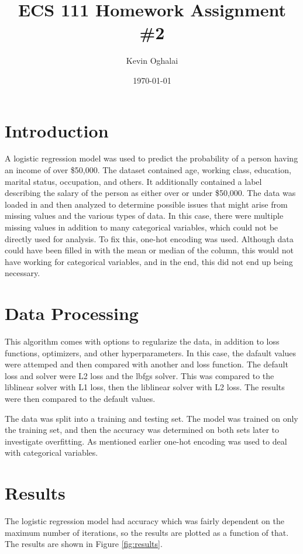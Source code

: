\documentclass[12pt]{article}
\title{ECS 111 Homework Assignment \#2}
\author{Kevin Oghalai}
\date{\today}
\begin{document}
\maketitle
\section{Introduction}
A logistic regression model was used to predict the probability of 
a person having an income of over \$50,000. The dataset contained age, working class, 
education, marital status, occupation, and others. It additionally contained a 
label describing the salary of the person as either over or under \$50,000.
The data was loaded in and then analyzed 
to determine possible issues that might arise from
missing values and the various types of data. 
In this case, there were multiple missing values 
in addition to many categorical variables, which could not be 
directly used for analysis. To fix this, one-hot encoding was used. 
Although data could have been filled in with the mean or median of the 
column, this would not have working for categorical variables, and in the end,
this did not end up being necessary.

\section{Data Processing}
This algorithm comes with
options to regularize the data, in addition to loss functions, optimizers, and other 
hyperparameters. In this case, the dafault values were attemped and then compared with another
and loss function. The default loss and solver were L2 loss and the lbfgs solver. 
This was compared to the liblinear solver with L1 loss, then the liblinear
solver with L2 loss. The results were then compared to the default values.

The data was split into a training and testing set. The model was trained on 
only the training set, and then the accuracy was determined on both sets later  
to investigate overfitting. As mentioned earlier one-hot encoding was used to 
deal with categorical variables. 

\section{Results}
The logistic regression model had accuracy which was fairly dependent
on the maximum number of iterations, so the results are plotted as a function 
of that. The results are shown in Figure \ref{fig:results}.
\end{document}
